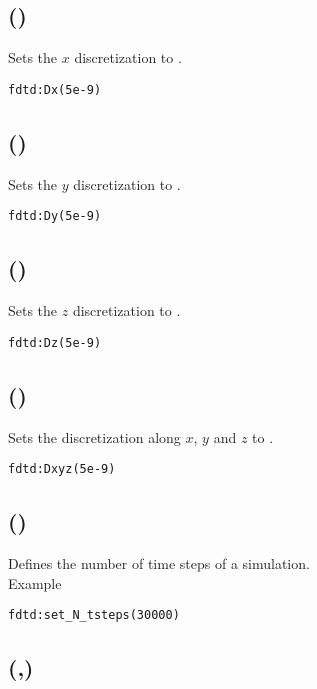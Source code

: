 \subsection[Dx]{()}

Sets the $x$ discretization to .
\begin{lstlisting}
fdtd:Dx(5e-9)
\end{lstlisting}

\subsection[Dy]{()}

Sets the $y$ discretization to .
\begin{lstlisting}
fdtd:Dy(5e-9)
\end{lstlisting}

\subsection[Dz]{()}

Sets the $z$ discretization to .
\begin{lstlisting}
fdtd:Dz(5e-9)
\end{lstlisting}

\subsection[Dxyz]{()}

Sets the discretization along $x$, $y$ and $z$ to .
\begin{lstlisting}
fdtd:Dxyz(5e-9)
\end{lstlisting}

\subsection[N\_tsteps]{()}

Defines the number of time steps  of a simulation.\\ Example
\begin{lstlisting}
fdtd:set_N_tsteps(30000)
\end{lstlisting}

\subsection[material]{(,)}

